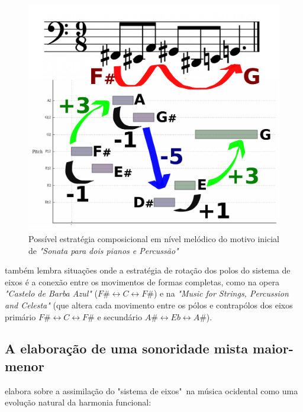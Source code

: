 \documentclass[
	12pt,				%
	openright,			%
	twoside,			%
	a4paper,			%
	english,			%
	french,				%
	spanish,			%
	brazil				%
	]{abntex2}
\begin{document}
\begin{figure}[!h]
	\caption{\label{fig_grafico}Possível estratégia composicional em nível melódico do motivo inicial de \textit{"Sonata para dois pianos e Percussão"}}
	\begin{center}
	    \includegraphics[scale=0.4]{axis/temasonata2P.pdf}
	\end{center}
\end{figure}

 também lembra situações onde a estratégia de rotação dos polos do sistema de eixos é a conexão entre os movimentos de formas completas, como na opera \textit{"Castelo de Barba Azul"} ($F\# \leftrightarrow  C \leftrightarrow F\#$) e na \textit{"Music for Strings, Percussion and Celesta" } (que altera cada movimento entre os pólos e contrapólos dos eixos primário $F\# \leftrightarrow  C \leftrightarrow F\#$ e secundário $A\# \leftrightarrow  Eb \leftrightarrow A\#$).
\pagebreak


\subsection{A elaboração de uma sonoridade mista maior-menor}
\label{lendvai_maior_menor}

 elabora sobre a assimilação do "sistema de eixos"\ na música ocidental como uma evolução natural da harmonia funcional: 
\end{document}
